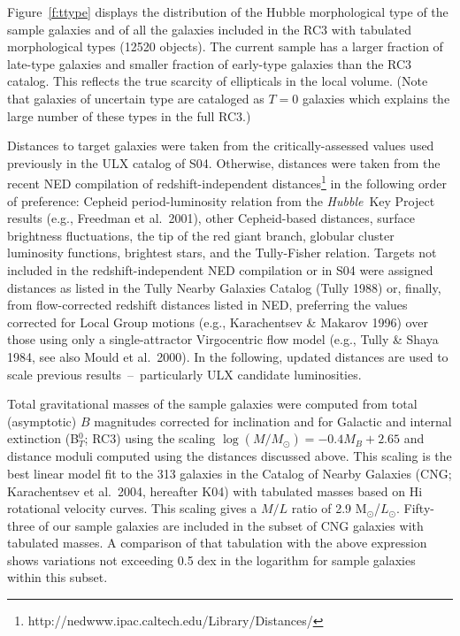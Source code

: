 \documentclass{article}
\newcommand{\msun}{M$_{\odot}$}
\newcommand{\hst}{{\sl Hubble}}
\newcommand{\etal}{et al.}
\begin{document}
Figure~\ref{f:ttype} displays the distribution of the Hubble morphological 
 type of the sample galaxies and of all the galaxies included in the RC3
 with tabulated morphological types (12520 objects). The current sample has
a larger fraction of late-type galaxies and smaller fraction of early-type 
galaxies than the RC3 catalog. This reflects the true scarcity of ellipticals
in the local volume. 
(Note that galaxies of uncertain type are cataloged as $T=0$ galaxies
 which explains the large number of these types in the full RC3.)

Distances to target galaxies were taken from the critically-assessed values 
 used previously in the ULX catalog of S04.
Otherwise, distances were taken from the recent NED compilation
of redshift-independent distances\footnote{http://nedwww.ipac.caltech.edu/Library/Distances/} 
 in the following order of preference:
Cepheid period-luminosity relation from the \hst\ Key Project results
(e.g., Freedman \etal\ 2001), other Cepheid-based
distances, surface brightness fluctuations, the tip of the red giant branch, 
 globular cluster luminosity functions, brightest stars,
and the Tully-Fisher relation. 
Targets not included in the redshift-independent 
NED compilation or in S04 were assigned distances as
listed in the Tully Nearby Galaxies Catalog (Tully 1988)
or, finally, from flow-corrected redshift distances listed in NED,
preferring the values corrected for Local Group motions
(e.g., Karachentsev \& Makarov 1996) over those using only a
single-attractor Virgocentric flow model (e.g., Tully \& Shaya 1984, see also
Mould \etal\ 2000). In the following,
updated distances are used to scale previous results~--~particularly
ULX candidate luminosities.

Total gravitational 
 masses of the sample galaxies were computed from total (asymptotic)
 $B$ magnitudes corrected for 
 inclination and for Galactic and internal extinction (B$_T^0$; RC3) 
 using the scaling  
$\log(M/M_{\odot})=-0.4M_B+2.65$
and distance moduli computed using the distances discussed above.
This scaling is the best linear model fit to the 313 galaxies in the 
Catalog of Nearby Galaxies 
 (CNG; Karachentsev \etal\ 2004, hereafter K04) %
 with tabulated masses based on H{\sc i} rotational velocity curves. 
This scaling gives a $M/L$ ratio of 2.9 \msun/$L_{\odot}$. 
Fifty-three of our sample galaxies are included in the subset of CNG 
galaxies with tabulated masses. A comparison of that tabulation with the 
above expression shows variations not exceeding 0.5 dex in the logarithm
 for sample galaxies within this subset.
\end{document}
